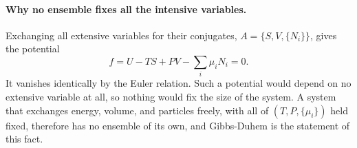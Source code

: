 \paragraph{Why no ensemble fixes all the intensive variables.}
Exchanging all extensive variables for their conjugates, $A=\{S,V,\{N_i\}\}$,
gives the potential
\begin{equation*}
    f=U-TS+PV-\sum_i\mu_iN_i=0.
\end{equation*}
It vanishes identically by the Euler relation. Such a potential would depend
on no extensive variable at all, so nothing would fix the size of the system.
A system that exchanges energy, volume, and particles freely, with all of
$(T,P,\{\mu_i\})$ held fixed, therefore has no ensemble of its own, and
Gibbs-Duhem is the statement of this fact.